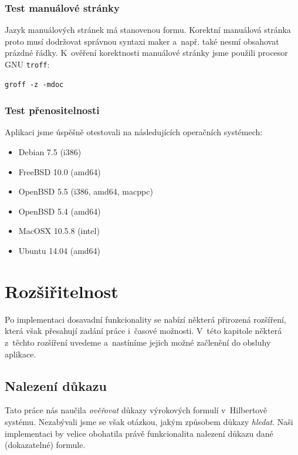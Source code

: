 \documentclass[thesis=B,czech,hidelinks]{thesis}[2012/06/26]
\begin{document}
\subsection{Test manuálové stránky}

Jazyk manuálových stránek má stanovenou formu. Korektní manuálová stránka proto musí dodržovat správnou syntaxi maker a~např. také nesmí obsahovat prázdné řádky. K~ověření korektnosti manuálové stránky jsme použili procesor GNU \texttt{troff}:

\begin{lstlisting}
groff -z -mdoc
\end{lstlisting}

\subsection{Test přenositelnosti}

Aplikaci jsme úspěšně otestovali na následujících operačních systémech:

\begin{itemize}
	\item Debian 7.5 (i386)
	\item FreeBSD 10.0 (amd64)
	\item OpenBSD 5.5 (i386, amd64, macppc)
	\item OpenBSD 5.4 (amd64)
	\item MacOSX 10.5.8 (intel)
	\item Ubuntu 14.04 (amd64)
\end{itemize}

%
%
%

\chapter{Rozšiřitelnost}

Po implementaci dosavadní funkcionality se nabízí některá přirozená rozšíření, která však přesahují zadání práce i~časové možnosti. V~této kapitole některá z~těchto rozšíření uvedeme a~nastíníme jejich možné začlenění do obsluhy aplikace.

\section{Nalezení důkazu}

Tato práce nás naučila \emph{ověřovat} důkazy výrokových formulí v~Hilbertově systému. Nezabývali jsme se však otázkou, jakým způsobem důkazy \emph{hledat}. Naši implementaci by velice obohatila právě funkcionalita nalezení důkazu dané (dokazatelné) formule.
\end{document}
